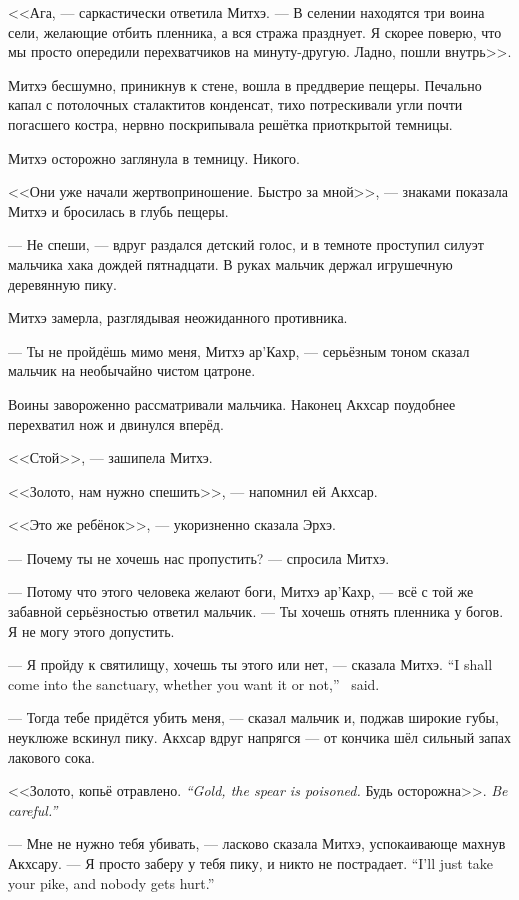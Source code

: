 <<Ага, --- саркастически ответила Митхэ.
--- В селении находятся три воина сели, желающие отбить пленника, а вся стража празднует.
Я скорее поверю, что мы просто опередили перехватчиков на минуту-другую.
Ладно, пошли внутрь>>.

Митхэ бесшумно, приникнув к стене, вошла в преддверие пещеры.
Печально капал с потолочных сталактитов конденсат, тихо потрескивали угли почти погасшего костра, нервно поскрипывала решётка приоткрытой темницы.

Митхэ осторожно заглянула в темницу.
Никого.

<<Они уже начали жертвоприношение. Быстро за мной>>, --- знаками показала Митхэ и бросилась в глубь пещеры.

--- Не спеши, --- вдруг раздался детский голос, и в темноте проступил силуэт мальчика хака дождей пятнадцати.
В руках мальчик держал игрушечную деревянную пику.

Митхэ замерла, разглядывая неожиданного противника.

--- Ты не пройдёшь мимо меня, Митхэ ар’Кахр, --- серьёзным тоном сказал мальчик на необычайно чистом цатроне.

Воины завороженно рассматривали мальчика.
Наконец Акхсар поудобнее перехватил нож и двинулся вперёд.

<<Стой>>, --- зашипела Митхэ.

<<Золото, нам нужно спешить>>, --- напомнил ей Акхсар.

<<Это же ребёнок>>, --- укоризненно сказала Эрхэ.

--- Почему ты не хочешь нас пропустить? --- спросила Митхэ.

--- Потому что этого человека желают боги, Митхэ ар’Кахр, --- всё с той же забавной серьёзностью ответил мальчик.
--- Ты хочешь отнять пленника у богов.
Я не могу этого допустить.

{--- Я пройду к святилищу, хочешь ты этого или нет, --- сказала Митхэ.}
{``I shall come into the sanctuary, whether you want it or not,'' \Mitchoe\ said.}

--- Тогда тебе придётся убить меня, --- сказал мальчик и, поджав широкие губы, неуклюже вскинул пику.
Акхсар вдруг напрягся --- от кончика шёл сильный запах лакового сока.

{<<Золото, копьё отравлено.}
{\emph{``Gold, the spear is poisoned.}}
{Будь осторожна>>.}
{\emph{Be careful.''}}

--- Мне не нужно тебя убивать, --- ласково сказала Митхэ, успокаивающе махнув Акхсару.
{--- Я просто заберу у тебя пику, и никто не пострадает.}
{``I'll just take your pike, and nobody gets hurt.''}


